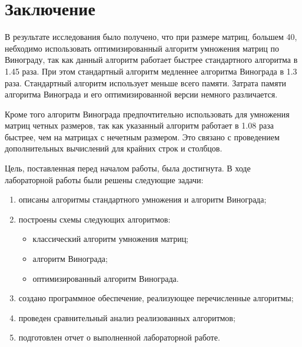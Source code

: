 \chapter*{Заключение}

В результате исследования было получено, что при размере матриц, большем 40, небходимо использовать оптимизированный алгоритм умножения матриц по Винограду, так как данный алгоритм работает быстрее стандартного алгоритма в 1.45 раза. При этом стандартный алгоритм медленнее алгоритма Винограда в 1.3 раза. Стандартный алгоритм использует меньше всего памяти. Затрата памяти алгоритма Винограда и его оптимизированной версии немного различается.

Кроме того алгоритм Винограда предпочтительно использовать для умножения матриц четных размеров, так как указанный алгоритм работает в 1.08 раза быстрее, чем на матрицах с нечетным размером. Это связано с проведением дополнительных вычислений для крайних строк и столбцов.

Цель, поставленная перед началом работы, была достигнута. В ходе лабораторной работы были решены следующие задачи:

\begin{enumerate}[label={\arabic*)}]
	\item описаны алгоритмы стандартного умножения и алгоритм Винограда;
	\item построены схемы следующих алгоритмов:
	\begin{itemize}[label=---]
		\item классический алгоритм умножения матриц;
		\item алгоритм Винограда;
		\item оптимизированный алгоритм Винограда.
	\end{itemize}
	\item создано программное обеспечение, реализующее перечисленные алгоритмы;
	\item проведен сравнительный анализ реализованных алгоритмов;
	\item подготовлен отчет о выполненной лабораторной работе.
\end{enumerate}
